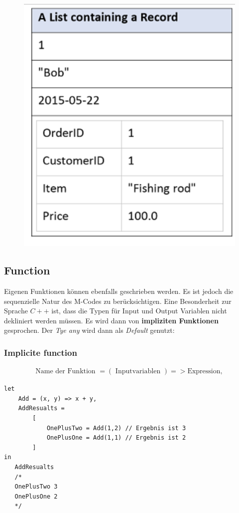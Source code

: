 \begin{figure}[H]
	\centering
	\includegraphics[scale = 0.3]{attachment/chapter_1/screenshot031}
	\caption{}
	\label{fig:screenshot031}
\end{figure}


\subsection{Function} 
Eigenen Funktionen können ebenfalls geschrieben werden. Es ist jedoch die sequenzielle Natur des M-Codes zu berücksichtigen. Eine Besonderheit zur Sprache $C++$ ist, dass die Typen für Input und Output Variablen nicht dekliniert werden müssen. Es wird dann von \textbf{impliziten Funktionen} gesprochen. Der \textit{Tye any} wird dann als \textit{Default} genutzt:
\subsubsection{Implicite function}
\begin{align}
\text{Name der Funktion } = \left(\text{ Inputvariablen }\right) = > \text{Expression}, 
\end{align} 
\begin{lstlisting}[style=M]
let  
	Add = (x, y) => x + y,
	AddResualts = 
		[
			OnePlusTwo = Add(1,2) // Ergebnis ist 3
			OnePlusOne = Add(1,1) // Ergebnis ist 2
		]
in   
   AddResualts 
   /*
   OnePlusTwo 3
   OnePlusOne 2
   */
\end{lstlisting}


